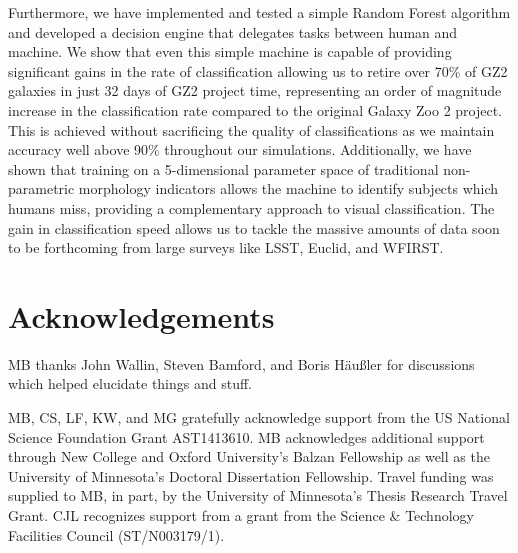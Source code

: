 \documentclass[twocolumn]{aastex6}
\begin{document}
Furthermore, we have implemented and tested a simple Random Forest algorithm 
and developed a decision engine that delegates tasks between human and 
machine.  We show that even this simple machine is capable of providing significant 
gains in the rate of classification allowing us to retire over 70\% of GZ2 galaxies in 
just 32 days of GZ2 project time, representing an order of magnitude increase in the
classification rate compared to the original Galaxy Zoo 2 project. This is achieved without 
sacrificing the quality of classifications as we maintain accuracy well above 90\% 
throughout our simulations. 
Additionally, we have shown that training on a 5-dimensional parameter space of 
traditional non-parametric morphology indicators allows the
machine to identify subjects which humans miss, providing  a complementary 
approach to visual classification. 
The gain in classification speed allows us to tackle the massive amounts of data soon
to be forthcoming from large surveys like LSST, Euclid, and WFIRST. 



\section{Acknowledgements}
MB thanks John Wallin, Steven Bamford, and Boris H{\"a}u{\ss}ler for discussions which helped elucidate things and stuff. 

MB, CS, LF, KW, and MG gratefully acknowledge support from the US National Science
Foundation Grant AST1413610.  MB acknowledges additional support 
through New College and Oxford University's Balzan Fellowship as well as the University
of Minnesota's Doctoral Dissertation Fellowship. Travel funding was supplied 
to MB, in part, by the University of Minnesota's Thesis Research Travel Grant. CJL recognizes support from a grant from the Science \& Technology Facilities Council (ST/N003179/1). 
\end{document}
